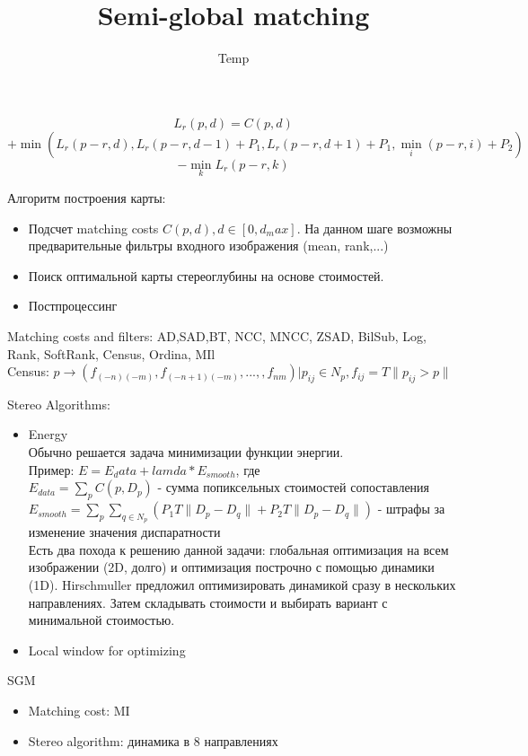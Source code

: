 \documentclass[14pt]{article} %
\title{Semi-global matching}
\author{Temp}
\date{}
\begin{document}
\maketitle


$$L_r(p, d) = C(p, d) $$ $$+ \min ( L_r(p - r, d), L_r (p - r, d - 1) + P_1, L_r(p - r, d + 1) + P_1, \min_{i} (p - r, i) + P_2) $$ $$- \min\limits_{k}  L_r(p - r, k)$$

Алгоритм построения карты:
\begin{itemize}
 \item Подсчет matching costs $C(p,d), d \in [0, d_max]$. На данном шаге возможны предварительные фильтры входного изображения (mean, rank,...)
 \item Поиск оптимальной карты стереоглубины на основе стоимостей. 
 \item Постпроцессинг
\end{itemize} 


Matching costs and filters: AD,SAD,BT, NCC, MNCC, ZSAD, BilSub, Log, Rank, SoftRank, Census, Ordina, MIl \\
Census: $ p \to (f_{(-n)(-m)}, f_{(-n+1)(-m)}, ...,,  f_{nm})| p_{ij} \in N_p,  f_{ij} = T \| p_{ij} > p \| $

Stereo Algorithms:
\begin{itemize}
\item Energy \\
    Обычно решается задача минимизации функции энергии. \\
     Пример: $E = E_data  + lamda * E_{smooth} $,  где  \\
     $ E_{data} = \sum_p C(p, D_p) $ -  сумма попиксельных стоимостей сопоставления \\
      $E_{smooth} = \sum_{p} \sum_{q \in N_p}(P_1 T \|D_p-D_q\| + P_2 T\|D_p -D_q\|)$ -  штрафы за изменение значения диспаратности\\
   Есть два похода к решению данной задачи: глобальная оптимизация на всем изображении (2D, долго) и оптимизация построчно с помощью динамики (1D). Hirschmuller  предложил оптимизировать динамикой сразу в нескольких направлениях. Затем складывать стоимости и выбирать вариант с минимальной стоимостью.
\item Local window for optimizing
\end{itemize}

SGM
\begin{itemize}
 \item Matching cost: MI 
 \item Stereo algorithm: динамика в 8 направлениях
\end{itemize} 
\end{document}
